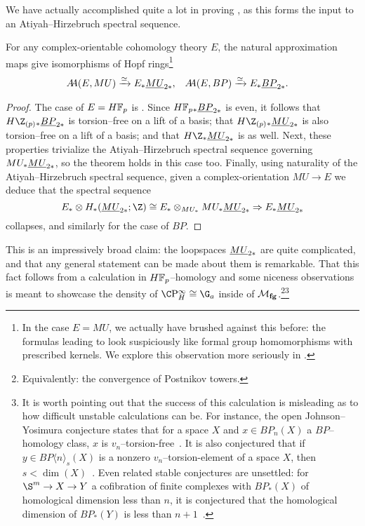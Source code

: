 We have actually accomplished quite a lot in proving , as this forms the input to an Atiyah--Hirzebruch spectral sequence.

\begin{corollary}\label{HopfRingForEBP}
For any complex-orientable cohomology theory \(E\), the natural approximation maps give isomorphisms of Hopf rings\footnote{In the case \(E = MU\), we actually have brushed against this before: the formulas leading to  look suspiciously like formal group homomorphisms with prescribed kernels.  We explore this observation more seriously in .}
\begin{align*}
\AA(E, MU)  & \xrightarrow{\simeq} E_* \OS{MU}{2*}, &
\AA(E, BP) & \xrightarrow{\simeq} E_* \OS{BP}{2*}.
\end{align*}
\end{corollary}
\begin{proof}
The case of \(E = \HFp\) is .  Since \(\HFp_* \OS{BP}{2*}\) is even, it follows that \(H\Z_{(p)}{}_* \OS{BP}{2*}\) is torsion--free on a lift of a basis; that \(H\Z_{(p)}{}_* \OS{MU}{2*}\) is also torsion--free on a lift of a basis; and that \(H\Z_* \OS{MU}{2*}\) is as well.  Next, these properties trivialize the Atiyah--Hirzebruch spectral sequence governing \(MU_* \OS{MU}{2*}\), so the theorem holds in this case too.  Finally, using naturality of the Atiyah--Hirzebruch spectral sequence, given a complex-orientation \(MU \to E\) we deduce that the spectral sequence \[E_* \otimes H_*(\OS{MU}{2*}; \Z) \cong E_* \otimes_{MU_*} MU_* \OS{MU}{2*} \Rightarrow E_* \OS{MU}{2*}\] collapses, and similarly for the case of \(BP\).
\end{proof}

This is an impressively broad claim: the loopspaces \(\OS{MU}{2*}\) are quite complicated, and that any general statement can be made about them is remarkable.  That this fact follows from a calculation in \(\HFp\)--homology and some niceness observations is meant to showcase the density of \(\CP^\infty_H \cong \G_a\) inside of \(\mathcal{M}_{\mathbf{fg}}\).\footnote{Equivalently: the convergence of Postnikov towers.}\footnote{It is worth pointing out that the success of this calculation is misleading as to how difficult unstable calculations can be.  For instance, the open Johnson--Yosimura conjecture states that for a space \(X\) and \(x \in BP_n(X)\) a \(BP\)--homology class, \(x\) is \(v_n\)--torsion-free~\cite[pg.\ 37]{Wilson}.  It is also conjectured that if \(y \in BP\langle n \rangle_s(X)\) is a nonzero \(v_n\)--torsion-element of a space $X$, then \(s < \dim(X)\)~\cite[Question 6.11]{JohnsonWilsonProjDim}.  Even related stable conjectures are unsettled: for \(\S^m \to X \to Y\) a cofibration of finite complexes with \(BP_*(X)\) of homological dimension less than \(n\), it is conjectured that the homological dimension of \(BP_*(Y)\) is less than \(n+1\)~\cite[Conjecture 6.8]{JohnsonWilsonProjDim}.}

